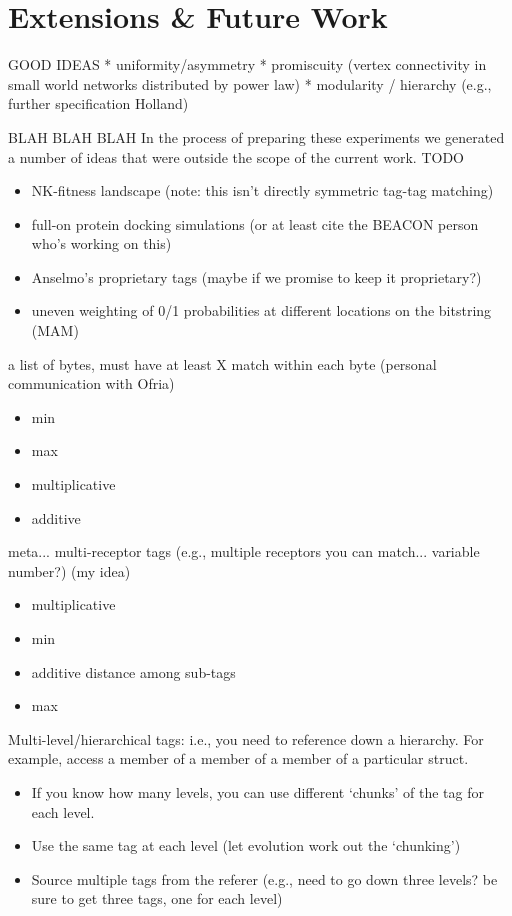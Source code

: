 \section{Extensions \& Future Work}


GOOD IDEAS
* uniformity/asymmetry
  * promiscuity (vertex connectivity in small world networks distributed by power law)
  * modularity / hierarchy (e.g., further specification Holland)


BLAH BLAH BLAH
In the process of preparing these experiments we generated a number of ideas that were outside the scope of the current work.
TODO

\begin{itemize}
\item NK-fitness landscape \citep{kauffman1987towards} (note: this isn't directly symmetric tag-tag matching)
\item full-on protein docking simulations (or at least cite the BEACON person who's working on this)
\item Anselmo's proprietary tags (maybe if we promise to keep it proprietary?)
\item uneven weighting of 0/1 probabilities at different locations on the bitstring (MAM)
\end{itemize}

a list of bytes, must have at least X match within each byte (personal communication with Ofria)
\begin{itemize}
\item min
\item max
\item multiplicative
\item additive
\end{itemize}

meta... multi-receptor tags (e.g., multiple receptors you can match... variable number?) (my idea)
\begin{itemize}
\item multiplicative
\item min
\item additive distance among sub-tags
\item max
\end{itemize}

Multi-level/hierarchical tags: i.e., you need to reference down a hierarchy. For
example, access a member of a member of a member of a particular struct.
\begin{itemize}
  \item If you know how many levels, you can use different `chunks' of the tag for
        each level.
  \item Use the same tag at each level (let evolution work out the `chunking')
  \item Source multiple tags from the referer (e.g., need to go down three levels?
    be sure to get three tags, one for each level)
\end{itemize}

